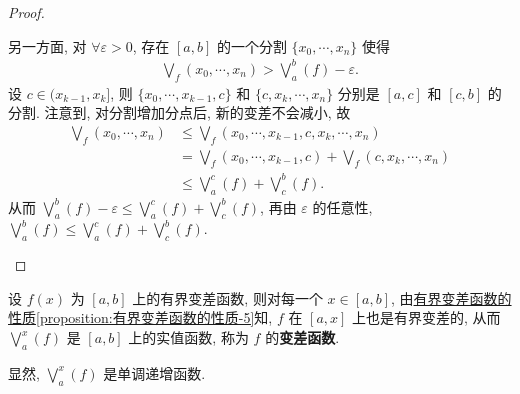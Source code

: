 \documentclass[../../main.tex]{subfiles}%
\begin{document}
\begin{proof}
\begin{enumerate}[(1)]
另一方面, 对 $\forall\varepsilon>0$, 存在 $[a,b]$ 的一个分割 $\{x_0,\cdots,x_n\}$ 使得
\begin{align*}
\bigvee_f(x_0,\cdots,x_n)>\bigvee_a^b(f)-\varepsilon.
\end{align*}
设 $c\in(x_{k-1},x_k]$, 则 $\{x_0,\cdots,x_{k-1},c\}$ 和 $\{c,x_k,\cdots,x_n\}$ 分别是 $[a,c]$ 和 $[c,b]$ 的分割. 注意到, 对分割增加分点后, 新的变差不会减小, 故
\begin{align*}
\bigvee_f(x_0,\cdots,x_n) &\leqslant \bigvee_f(x_0,\cdots,x_{k-1},c,x_k,\cdots,x_n) \\
&= \bigvee_f(x_0,\cdots,x_{k-1},c)+\bigvee_f(c,x_k,\cdots,x_n) \\
&\leqslant \bigvee_a^c(f)+\bigvee_c^b(f).
\end{align*}
从而 $\bigvee_a^b(f)-\varepsilon\leqslant\bigvee_a^c(f)+\bigvee_c^b(f)$, 再由 $\varepsilon$ 的任意性, $\bigvee_a^b(f)\leqslant\bigvee_a^c(f)+\bigvee_c^b(f)$.
\end{enumerate}

\end{proof}

\begin{definition}[变差函数]
设 $f(x)$ 为 $[a,b]$ 上的有界变差函数, 则对每一个 $x\in[a,b]$, 由\hyperref[proposition:有界变差函数的性质]{有界变差函数的性质\ref{proposition:有界变差函数的性质-5}}知, $f$ 在 $[a,x]$ 上也是有界变差的, 从而 $\bigvee_a^x(f)$ 是 $[a,b]$ 上的实值函数, 称为 $f$ 的\textbf{变差函数}.
\end{definition}
\begin{remark}
显然, $\bigvee_a^x(f)$ 是单调递增函数.
\end{remark}
\end{document}
